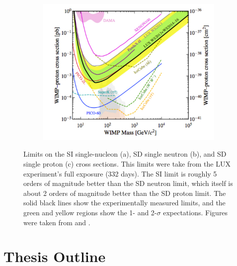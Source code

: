 \begin{figure}
\begin{subfigure}[b]{0.475\textwidth}
        \end{subfigure}
        \quad
        \begin{subfigure}[b]{0.475\textwidth}   
            \centering 
            \includegraphics[width=\textwidth]{Figures/WIMP_proton.pdf}
            \caption{}
            \label{fig:wimplimits_sdp}
        \end{subfigure}
        \caption{Limits on the SI single-nucleon (a), SD single neutron (b), and SD single proton (c) cross sections. This limits were take from the LUX experiment's full exposure (332 days). The SI limit is roughly 5 orders of magnitude better than the SD neutron limit, which itself is about 2 orders of magnitude better than the SD proton limit. The solid black lines show the experimentally measured limits, and the green and yellow regions show the 1- and 2-$\sigma$ expectations. Figures were taken from \cite{lux_2017} and \cite{lux_sd}.}
        \label{fig:wimplimits}
    \end{figure}


\section{Thesis Outline}
